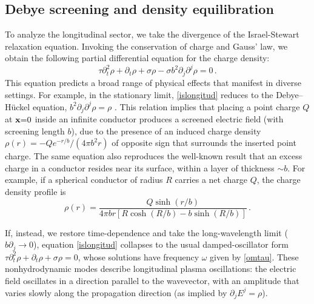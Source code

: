 \documentclass[a4paper, amsfonts, amssymb, amsmath, reprint, showkeys, nofootinbib, twoside,notitlepage,onecolumn]{revtex4-1}
\theoremstyle{definition}
\theoremstyle{theorem}
\begin{document}
\subsection{Debye screening and density equilibration}
\vspace{-0.2cm}

To analyze the longitudinal sector, we take the divergence of the Israel-Stewart relaxation equation. Invoking the conservation of charge and Gauss' law, we obtain the following partial differential equation for the charge density:
\begin{equation}\label{islongitud}
\tau \partial^2_t \rho  +\partial_t \rho +\sigma\rho- \sigma b^2\partial_j  \partial^j \rho=0\, .
\end{equation}
This equation predicts a broad range of physical effects that manifest in diverse settings. For example, in the stationary limit, \eqref{islongitud} reduces to the Debye–Hückel equation, $b^2\partial_j\partial^j\rho=\rho$ \cite[\S 1.6]{bellan_2006}. This relation implies that placing a point charge $Q$ at ${\bf x}{=}0$ inside an infinite conductor produces a screened electric field (with screening length $b$), due to the presence of an induced charge density $\rho(r)=-Q e^{-r/b}/(4\pi b^2 r)$ of opposite sign that surrounds the inserted point charge. The same equation also reproduces the well-known result that an excess charge in a conductor resides near its surface, within a layer of thickness $\sim b$. For example, if a spherical conductor of radius $R$ carries a net charge $Q$, the charge density profile is
\begin{equation}
\rho(r)=\dfrac{Q\sinh(r/b)}{4\pi b r \!\left[R\cosh(R/b)-b\sinh(R/b)\right]} \, .
\end{equation}

If, instead, we restore time-dependence and take the long-wavelength limit ($b\partial_j \to 0$), equation \eqref{islongitud} collapses to the usual damped-oscillator form $\tau \partial_t^2 \rho + \partial_t \rho + \sigma \rho = 0$, whose solutions have frequency $\omega$ given by \eqref{omtau}. These nonhydrodynamic modes describe longitudinal plasma oscillations: the electric field oscillates in a direction parallel to the wavevector, with an amplitude that varies slowly along the propagation direction (as implied by $\partial_j E^j = \rho$).
\end{document}

